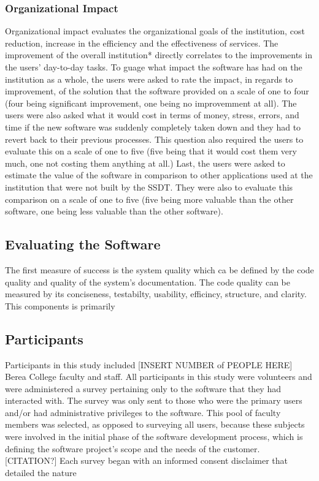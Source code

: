 \subsubsection{Organizational Impact}
Organizational impact evaluates the organizational goals of the institution, cost reduction, increase in the efficiency and the effectiveness of services. The improvement of the overall institution* directly correlates to the improvements in the users' day-to-day tasks. To guage what impact the software has had on the institution as a whole, the users were asked to rate the impact, in regards to improvement, of the solution that the software provided on a scale of one to four (four being significant improvement, one being no improvemment at all). The users were also asked what it would cost in terms of money, stress, errors, and time if the new software was suddenly completely taken down and they had to revert back to their previous processes. This question also required the users to evaluate this on a scale of one to five (five being that it would cost them very much, one not costing them anything at all.) Last, the users were asked to estimate the value of the software in comparison to other applications used at the institution that were not built by the SSDT. They were also to evaluate this comparison on a scale of one to five (five being more valuable than the other software, one being less valuable than the other software).


\subsection{Evaluating the Software}
 The first measure of success is the system quality which ca be defined by the code quality and quality of the system's documentation. The code quality can be measured by its conciseness, testabilty, usability, efficincy, structure, and clarity. This components is primarily


\subsection{Participants}
Participants in this study included [INSERT NUMBER of PEOPLE HERE] Berea College faculty and staff. All participants in this study were volunteers and were administered a survey pertaining only to the software that they had interacted with. The survey was only sent to those who were the primary users and/or had administrative privileges to the software. This pool of faculty members was selected, as opposed to surveying all users, because these subjects were involved in the initial phase of the software development process, which is defining the software project’s scope and the needs of the customer. [CITATION?] Each survey began with an informed consent disclaimer that detailed the nature

